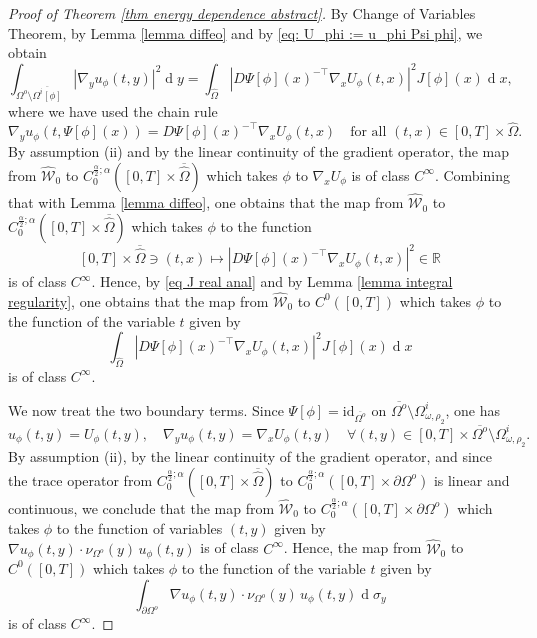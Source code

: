 \documentclass[11pt,reqno,a4paper]{amsart}
\theoremstyle{plain}
\theoremstyle{definition}
\newcommand{\R}{\mathbb{R}}
\renewcommand{\d}[1]{\ensuremath{\operatorname{d}\!{#1}}}
\begin{document}
\begin{proof}[Proof of Theorem \ref{thm energy dependence abstract}]
    By Change of Variables Theorem, by Lemma \ref{lemma diffeo} and by \eqref{eq: U_phi := u_phi Psi phi}, we obtain 
    \[
        \int_{\Omega^o\setminus\overline{\Omega^i[\phi]}}|\nabla_y u_\phi(t,y)|^2 \d y
        =
        \int_{\widehat\Omega}\left|D\Psi[\phi](x)^{-\top}\nabla_x U_\phi(t,x)\right|^2  J[\phi](x) \d x,
    \]
    where we have used the chain rule
    \[
        \nabla_y u_\phi(t,\Psi[\phi](x))
        = D\Psi[\phi](x)^{-\top}\nabla_x U_\phi(t,x) \quad \text{for all } (t,x) \in [0,T] \times \widehat\Omega.
    \]
    By assumption (ii) and by the linear continuity of the gradient operator, the map from $\widehat{\mathcal W}_0$ to $C_0^{\frac\alpha2;\alpha}([0,T]\times\overline{\widehat\Omega})$ which takes $\phi$ to $\nabla_x U_\phi$ is of class $C^\infty$. Combining that with Lemma \ref{lemma diffeo}, one obtains that the map from $\widehat{\mathcal{W}}_0$ to $C_0^{\frac{\alpha}{2}; \alpha}([0,T] \times \overline{\widehat\Omega})$ which takes $\phi$ to the function
    \[
    [0,T] \times \overline{\widehat\Omega} \ni (t,x) \longmapsto  \left|D\Psi[\phi](x)^{-\top}\nabla_x U_\phi(t,x)\right|^2 \in \R
    \]
    is of class $C^\infty$. Hence, by \eqref{eq J real anal} and by Lemma \ref{lemma integral regularity}, one obtains that the map from $\widehat{\mathcal{W}}_0$ to $C^0([0,T])$ which takes $\phi$ to the function of the variable $t$ given by
    \[
    \int_{\widehat{\Omega}} \left|D\Psi[\phi](x)^{-\top}\nabla_x{U}_\phi(t,x)\right|^2J[\phi](x) \d x 
    \]
    is of class $C^\infty$.

    We now treat the two boundary terms. Since $\Psi[\phi] = \mathrm{id}_{\overline{\Omega^o}}$ on $\overline{\Omega^o} \setminus \Omega^i_{\omega,\rho_2}$, one has
    \[
        u_{\phi}(t,y) = U_{\phi}(t,y), \quad \nabla_y u_\phi(t,y) = \nabla_x U_\phi(t,y)
        \quad \forall (t,y) \in [0,T] \times \overline{\Omega^o} \setminus \Omega^i_{\omega,\rho_2}.
    \]
    By assumption (ii), by the linear continuity of the gradient operator, and since the trace operator from $C_0^{\frac\alpha2;\alpha}([0,T]\times\overline{\widehat\Omega})$ to $C_0^{\frac\alpha2;\alpha}([0,T]\times\partial\Omega^o)$ is linear and continuous, we conclude that the map from $\widehat{\mathcal{W}}_0$  to $C_0^{\frac\alpha2;\alpha}([0,T]\times\partial\Omega^o)$ which takes $\phi$ to the function of variables $(t,y)$ given by $\nabla u_\phi(t,y)\cdot\nu_{\Omega^o}(y) \, u_{\phi}(t,y)$ is of class $C^\infty$. Hence, the map from $\widehat{\mathcal{W}}_0$ to $C^0([0,T])$ which takes $\phi$ to the function of the variable $t$ given by
    \[
    \int_{\partial\Omega^o} \nabla u_\phi(t,y)\cdot\nu_{\Omega^o}(y) \, u_{\phi}(t,y) \d\sigma_y
    \]
    is of class $C^\infty$.


\end{proof}
\end{document}
